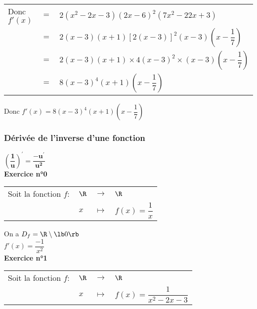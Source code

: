 \vspace*{.3cm}

\begin{tabular}{lll}
Donc $f'(x)$ & $=$ & $2\left(x^2 - 2x - 3\right)\left(2x - 6\right)^2\left(7x^2 - 22x +3\right)$ \\
& $=$ & $2\left(x-3\right)\left(x+1\right)\left[2\left(x-3\right)\right]^2\left(x-3\right)\left(x-\dfrac{1}{7}\right)$ \\ 
& $=$ & $2\left(x-3\right)\left(x+1\right) \times 4\left(x-3\right)^2 \times \left(x-3\right)\left(x-\dfrac{1}{7}\right)$ \\
& $=$ & $8\left(x-3\right)^4\left(x+1\right)\left(x-\dfrac{1}{7}\right)$ \\
\end{tabular}

\vspace*{.3cm}

Donc $f'(x) = 8\left(x-3\right)^4\left(x+1\right)\left(x-\dfrac{1}{7}\right)$ 

\newpage

\subsubsection{Dérivée de l'inverse d'une fonction}

$\mathbf{\left(\dfrac{1}{u}\right)^{'} = \dfrac{-u^{'}}{u^2}}$ \\

\textbf{Exercice n°0} \\

\begin{tabular}{llll}
Soit la fonction $f :$ & $\R$ & $\longrightarrow$ & $\R$ \\
& $x$ & $\longmapsto$ & $f(x) =  \dfrac{1}{x}$ \\
\end{tabular}

\vspace*{.3cm}

On a $D_f = \R \setminus \lb 0 \rb $ \\

$f'(x) = \dfrac{-1}{x^2}$ \\

\textbf{Exercice n°1} \\

\begin{tabular}{llll}
Soit la fonction $f :$ & $\R$ & $\longrightarrow$ & $\R$ \\
& $x$ & $\longmapsto$ & $f(x) = \dfrac{1}{x^2 - 2x - 3} $ \\
\end{tabular}

